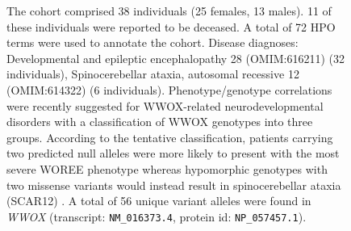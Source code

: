 \begin{figure}[htbp]
\vspace{2em}

\caption{ The cohort comprised 38 individuals (25 females, 13 males). 11 of these individuals were reported to be deceased. A total of 72 HPO terms were used to annotate the cohort. Disease diagnoses: Developmental and epileptic encephalopathy 28 (OMIM:616211) (32 individuals), Spinocerebellar ataxia, autosomal recessive 12 (OMIM:614322) (6 individuals). Phenotype/genotype correlations were recently suggested for WWOX-related neurodevelopmental disorders 
with a classification of WWOX genotypes into three groups. According to the tentative classification, patients carrying two predicted null alleles were more likely to present with the most severe WOREE phenotype whereas hypomorphic genotypes 
with two missense variants would instead result in spinocerebellar ataxia (SCAR12) \cite{PMID_30356099,PMID_25716914,PMID_25411445}. A total of 56 unique variant alleles were found in \textit{WWOX} (transcript: \texttt{NM\_016373.4}, protein id: \texttt{NP\_057457.1}).}
\end{figure}
